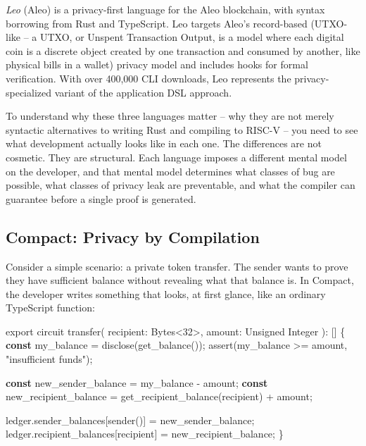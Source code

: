 \documentclass[
  11pt,
  openany]{report}
\newenvironment{Shaded}{\begin{snugshade}}{\end{snugshade}}
\newcommand{\AttributeTok}[1]{\textcolor[rgb]{0.75,0.60,1.00}{#1}}
\newcommand{\DecValTok}[1]{\textcolor[rgb]{0.91,0.66,0.43}{#1}}
\newcommand{\FunctionTok}[1]{\textcolor[rgb]{0.49,0.78,0.89}{#1}}
\newcommand{\ImportTok}[1]{\textcolor[rgb]{0.66,0.83,0.63}{#1}}
\newcommand{\KeywordTok}[1]{\textcolor[rgb]{0.62,0.65,1.00}{\textbf{#1}}}
\newcommand{\NormalTok}[1]{\textcolor[rgb]{0.78,0.80,0.85}{#1}}
\newcommand{\OperatorTok}[1]{\textcolor[rgb]{0.78,0.80,0.85}{#1}}
\newcommand{\StringTok}[1]{\textcolor[rgb]{0.66,0.83,0.63}{#1}}
\renewcommand{\textbf}[1]{{\bfseries\color{MidnightBold}#1}}
\renewenvironment{Shaded}{%
  \begin{tcolorbox}[
    colback=MidnightCode,
    colframe=MidnightBorder,
    arc=4pt,
    boxrule=0.5pt,
    left=8pt, right=8pt, top=6pt, bottom=6pt,
    breakable, enhanced
  ]%
}{\end{tcolorbox}}
\begin{document}
\emph{Leo} (Aleo) is a privacy-first language for the Aleo blockchain, with
syntax borrowing from Rust and TypeScript. Leo targets Aleo's record-based
(UTXO-like -- a UTXO, or Unspent Transaction Output, is a model where each
digital coin is a discrete object created by one transaction and consumed by
another, like physical bills in a wallet) privacy model and includes hooks for
formal verification. With over 400,000 CLI downloads, Leo represents the
privacy-specialized variant of the application DSL approach.

To understand why these three languages matter -- why they are not merely
syntactic alternatives to writing Rust and compiling to RISC-V -- you need to
see what development actually looks like in each one. The differences are not
cosmetic. They are structural. Each language imposes a different mental model on
the developer, and that mental model determines what classes of bug are
possible, what classes of privacy leak are preventable, and what the compiler
can guarantee before a single proof is generated.

\subsection{Compact: Privacy by
Compilation}\label{compact-privacy-by-compilation}

Consider a simple scenario: a private token transfer. The sender wants to prove
they have sufficient balance without revealing what that balance is. In Compact,
the developer writes something that looks, at first glance, like an ordinary
TypeScript function:

\begin{Shaded}
\begin{Highlighting}[]
\ImportTok{export}\NormalTok{ circuit }\FunctionTok{transfer}\NormalTok{(}
\NormalTok{  recipient}\OperatorTok{:}\NormalTok{ Bytes}\OperatorTok{\textless{}}\DecValTok{32}\OperatorTok{\textgreater{},}
\NormalTok{  amount}\OperatorTok{:}\NormalTok{ Unsigned Integer}
\NormalTok{)}\OperatorTok{:}\NormalTok{ [] \{}
  \KeywordTok{const}\NormalTok{ my\_balance }\OperatorTok{=} \FunctionTok{disclose}\NormalTok{(}\FunctionTok{get\_balance}\NormalTok{())}\OperatorTok{;}
  \FunctionTok{assert}\NormalTok{(my\_balance }\OperatorTok{\textgreater{}=}\NormalTok{ amount}\OperatorTok{,} \StringTok{"insufficient funds"}\NormalTok{)}\OperatorTok{;}

  \KeywordTok{const}\NormalTok{ new\_sender\_balance }\OperatorTok{=}\NormalTok{ my\_balance }\OperatorTok{{-}}\NormalTok{ amount}\OperatorTok{;}
  \KeywordTok{const}\NormalTok{ new\_recipient\_balance }\OperatorTok{=} \FunctionTok{get\_recipient\_balance}\NormalTok{(recipient) }\OperatorTok{+}\NormalTok{ amount}\OperatorTok{;}

\NormalTok{  ledger}\OperatorTok{.}\AttributeTok{sender\_balances}\NormalTok{[}\FunctionTok{sender}\NormalTok{()] }\OperatorTok{=}\NormalTok{ new\_sender\_balance}\OperatorTok{;}
\NormalTok{  ledger}\OperatorTok{.}\AttributeTok{recipient\_balances}\NormalTok{[recipient] }\OperatorTok{=}\NormalTok{ new\_recipient\_balance}\OperatorTok{;}
\NormalTok{\}}
\end{Highlighting}
\end{Shaded}
\end{document}
